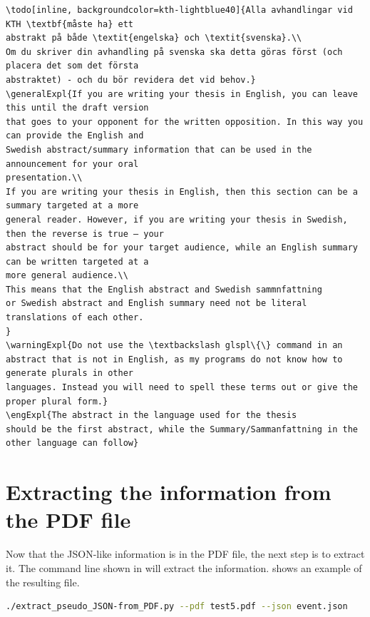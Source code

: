 \begin{lstlisting}[language={[LaTeX]TeX}, caption={\LaTeX~code for the Swedish abstract}, label=lst:latexAbtractsExampleSwedish]
\todo[inline, backgroundcolor=kth-lightblue40]{Alla avhandlingar vid KTH \textbf{måste ha} ett
abstrakt på både \textit{engelska} och \textit{svenska}.\\
Om du skriver din avhandling på svenska ska detta göras först (och placera det som det första
abstraktet) - och du bör revidera det vid behov.}
\generalExpl{If you are writing your thesis in English, you can leave this until the draft version
that goes to your opponent for the written opposition. In this way you can provide the English and
Swedish abstract/summary information that can be used in the announcement for your oral
presentation.\\
If you are writing your thesis in English, then this section can be a summary targeted at a more
general reader. However, if you are writing your thesis in Swedish, then the reverse is true – your
abstract should be for your target audience, while an English summary can be written targeted at a
more general audience.\\
This means that the English abstract and Swedish sammnfattning
or Swedish abstract and English summary need not be literal translations of each other.
}
\warningExpl{Do not use the \textbackslash glspl\{\} command in an
abstract that is not in English, as my programs do not know how to generate plurals in other
languages. Instead you will need to spell these terms out or give the proper plural form.}
\engExpl{The abstract in the language used for the thesis
should be the first abstract, while the Summary/Sammanfattning in the other language can follow}
\end{lstlisting}

\section{Extracting the information from the PDF file}
Now that the JSON-like information is in the PDF file, the next step is to extract it. The command line shown in  will extract the information.  shows an example of the resulting file.
\begin{lstlisting}[language={bash}, caption={Extract the JSON like information}, label=lst:extractPseudoJSONfromPDF-event]
./extract_pseudo_JSON-from_PDF.py --pdf test5.pdf --json event.json
\end{lstlisting}

